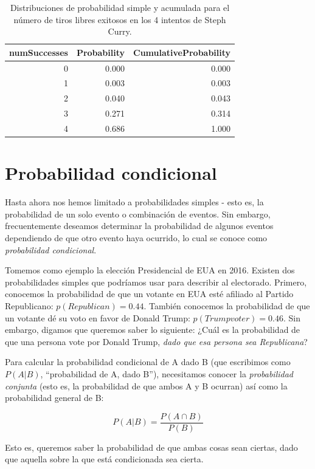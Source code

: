 \documentclass[
  12pt,
]{book}
\begin{document}
\begin{table}

\caption{\label{tab:freethrow}Distribuciones de probabilidad simple y acumulada para el número de tiros libres exitosos en los 4 intentos de Steph Curry.}
\centering
\begin{tabular}[t]{r|r|r}
\hline
numSuccesses & Probability & CumulativeProbability\\
\hline
0 & 0.000 & 0.000\\
\hline
1 & 0.003 & 0.003\\
\hline
2 & 0.040 & 0.043\\
\hline
3 & 0.271 & 0.314\\
\hline
4 & 0.686 & 1.000\\
\hline
\end{tabular}
\end{table}

\hypertarget{conditional-probability}{%
\section{Probabilidad condicional}\label{conditional-probability}}

Hasta ahora nos hemos limitado a probabilidades simples - esto es, la probabilidad de un solo evento o combinación de eventos. Sin embargo, frecuentemente deseamos determinar la probabilidad de algunos eventos dependiendo de que otro evento haya ocurrido, lo cual se conoce como \emph{probabilidad condicional}.

Tomemos como ejemplo la elección Presidencial de EUA en 2016. Existen dos probabilidades simples que podríamos usar para describir al electorado. Primero, conocemos la probabilidad de que un votante en EUA esté afiliado al Partido Republicano: \(p(Republican) = 0.44\). También conocemos la probabilidad de que un votante dé su voto en favor de Donald Trump: \(p(Trump voter)=0.46\). Sin embargo, digamos que queremos saber lo siguiente: ¿Cuál es la probabilidad de que una persona vote por Donald Trump, \emph{dado que esa persona sea Republicana}?

Para calcular la probabilidad condicional de A dado B (que escribimos como \(P(A|B)\), ``probabilidad de A, dado B''), necesitamos conocer la \emph{probabilidad conjunta} (esto es, la probabilidad de que ambos A y B ocurran) así como la probabilidad general de B:

\[
P(A|B) = \frac{P(A \cap B)}{P(B)}
\]

Esto es, queremos saber la probabilidad de que ambas cosas sean ciertas, dado que aquella sobre la que está condicionada sea cierta.
\end{document}
